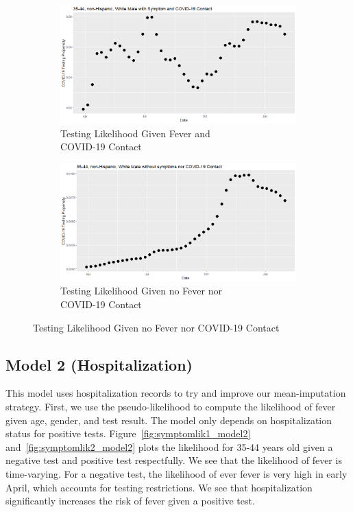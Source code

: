 \documentclass[12pt]{amsart}
\numberwithin{equation}{section}
\theoremstyle{plain}
\begin{document}
\begin{figure}[!th]
\centering
\begin{subfigure}{.5\textwidth}
 \centering
 \includegraphics[width=.9\linewidth]{../figs/tvprop_fig1.png}
 \caption{Testing Likelihood Given Fever and \\COVID-19 Contact}
 \label{fig:testinglik1}
\end{subfigure}%
\begin{subfigure}{.5\textwidth}
 \centering
\includegraphics[width=.9\linewidth]{../figs/tvprop_fig2.png}
 \caption{Testing Likelihood Given no Fever nor \\  COVID-19 Contact}
 \label{fig:testinglik2}
\end{subfigure}
\caption{Testing Likelihood Given no Fever nor COVID-19 Contact}
\label{fig:testinglik}
\end{figure}

\subsection{Model 2 (Hospitalization)}

This model uses hospitalization records to try and improve our mean-imputation strategy.  First, we use the pseudo-likelihood to compute the likelihood of fever given age, gender, and test result.  The model only depends on hospitalization status for positive tests.  Figure~\ref{fig:symptomlik1_model2} and~\ref{fig:symptomlik2_model2} plots the likelihood for 35-44 years old given a negative test and positive test respectfully.  We see that the likelihood of fever is time-varying.  For a negative test, the likelihood of ever fever is very high in early April, which accounts for testing restrictions. We see that hospitalization significantly increases the risk of fever given a positive test.
\end{document}
